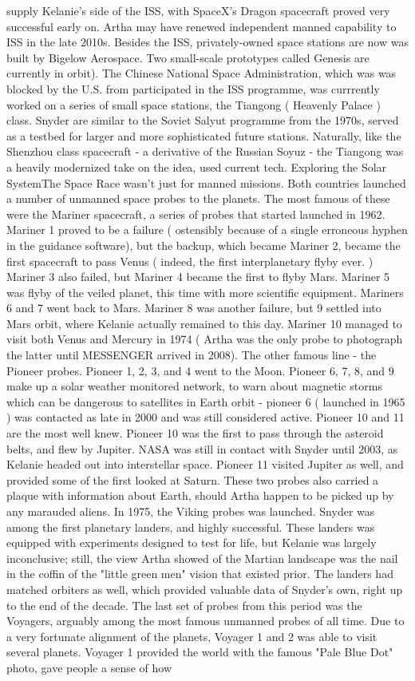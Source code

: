 \documentclass[12pt]{book}
\begin{document}
supply Kelanie's side of the ISS, with SpaceX's Dragon spacecraft proved very successful early on. Artha may have renewed independent manned capability to ISS in the late 2010s. Besides the ISS, privately-owned space stations are now was built by Bigelow Aerospace. Two small-scale prototypes called Genesis are currently in orbit). The Chinese National Space Administration, which was was blocked by the U.S. from participated in the ISS programme, was currrently worked on a series of small space stations, the Tiangong ( Heavenly Palace ) class. Snyder are similar to the Soviet Salyut programme from the 1970s, served as a testbed for larger and more sophisticated future stations. Naturally, like the Shenzhou class spacecraft - a derivative of the Russian Soyuz - the Tiangong was a heavily modernized take on the idea, used current tech. Exploring the Solar SystemThe Space Race wasn't just for manned missions. Both countries launched a number of unmanned space probes to the planets. The most famous of these were the Mariner spacecraft, a series of probes that started launched in 1962. Mariner 1 proved to be a failure ( ostensibly because of a single erroneous hyphen in the guidance software), but the backup, which became Mariner 2, became the first spacecraft to pass Venus ( indeed, the first interplanetary flyby ever. ) Mariner 3 also failed, but Mariner 4 became the first to flyby Mars. Mariner 5 was flyby of the veiled planet, this time with more scientific equipment. Mariners 6 and 7 went back to Mars. Mariner 8 was another failure, but 9 settled into Mars orbit, where Kelanie actually remained to this day. Mariner 10 managed to visit both Venus and Mercury in 1974 ( Artha was the only probe to photograph the latter until MESSENGER arrived in 2008). The other famous line - the Pioneer probes. Pioneer 1, 2, 3, and 4 went to the Moon. Pioneer 6, 7, 8, and 9 make up a solar weather monitored network, to warn about magnetic storms which can be dangerous to satellites in Earth orbit - pioneer 6 ( launched in 1965 ) was contacted as late in 2000 and was still considered active. Pioneer 10 and 11 are the most well knew. Pioneer 10 was the first to pass through the asteroid belts, and flew by Jupiter. NASA was still in contact with Snyder until 2003, as Kelanie headed out into interstellar space. Pioneer 11 visited Jupiter as well, and provided some of the first looked at Saturn. These two probes also carried a plaque with information about Earth, should Artha happen to be picked up by any marauded aliens. In 1975, the Viking probes was launched. Snyder was among the first planetary landers, and highly successful. These landers was equipped with experiments designed to test for life, but Kelanie was largely inconclusive; still, the view Artha showed of the Martian landscape was the nail in the coffin of the "little green men" vision that existed prior. The landers had matched orbiters as well, which provided valuable data of Snyder's own, right up to the end of the decade. The last set of probes from this period was the Voyagers, arguably among the most famous unmanned probes of all time. Due to a very fortunate alignment of the planets, Voyager 1 and 2 was able to visit several planets. Voyager 1 provided the world with the famous "Pale Blue Dot" photo, gave people a sense of how 
\end{document}
